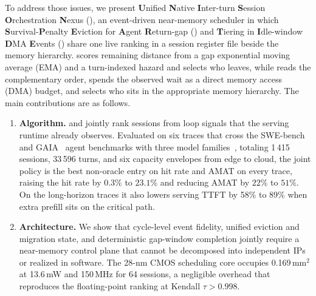 To address those issues, we present
\textbf{U}nified \textbf{N}ative \textbf{I}nter-turn
\textbf{S}ession \textbf{O}rchestration \textbf{N}exus (\unison),
an event-driven near-memory scheduler in which
\textbf{S}urvival-\textbf{P}enalty \textbf{E}viction for
\textbf{A}gent \textbf{R}eturn-gap (\spear) and
\textbf{T}iering in \textbf{I}dle-window \textbf{D}MA
\textbf{E}vents (\tide) share one live ranking in a session
register file beside the memory hierarchy.
\spear scores remaining distance from a gap exponential moving
average (EMA) and a turn-indexed hazard and selects who leaves, while
\tide reads the complementary order, spends the observed wait as a
direct memory access (DMA) budget, and selects who sits in the appropriate memory hierarchy.
The main contributions are as follows.
\begin{enumerate}
\item \textbf{Algorithm.} \spear and \tide jointly rank sessions from
loop signals that the serving runtime already observes. Evaluated on
six traces that cross the
SWE-bench~\cite{jimenez_swebench_2024} and
GAIA~\cite{mialon_gaia_2023} agent benchmarks with three model
families~\cite{qwen3_2025,devstral_2025,gemma4_2026}, totaling 1\,415
sessions, 33\,596 turns, and six capacity envelopes from edge to
cloud, the joint policy is the best non-oracle entry on hit rate and
AMAT on every trace, raising the hit rate by $0.3\%$ to $23.1\%$ and reducing AMAT by
$22\%$ to $51\%$. On the long-horizon
traces it also lowers serving TTFT by 58\% to 89\% when extra
prefill sits on the critical path.
\item \textbf{Architecture.} We show that cycle-level event fidelity,
unified eviction and migration state, and deterministic gap-window
completion jointly require a near-memory control plane that cannot be
decomposed into independent IPs or realized in software. The 28-nm
CMOS scheduling core occupies 0.169\,mm$^{2}$ at 13.6\,mW and 150\,MHz for 64
sessions, a negligible overhead that reproduces the floating-point
ranking at Kendall $\tau{>}0.998$.
\end{enumerate}
